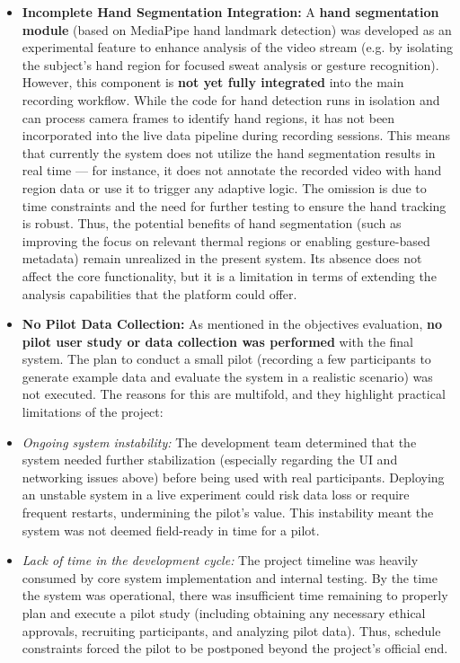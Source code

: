\documentclass[11pt,a4paper]{report}
\begin{document}
\begin{itemize}
\item \textbf{Incomplete Hand Segmentation Integration:} A \textbf{hand segmentation
  module} (based on MediaPipe hand landmark detection) was developed as
  an experimental feature to enhance analysis of the video stream (e.g.
  by isolating the subject's hand region for focused sweat analysis or
  gesture recognition). However, this component is \textbf{not yet fully
  integrated} into the main recording workflow. While the code for hand
  detection runs in isolation and can process camera frames to identify
  hand regions, it has not been incorporated into the live data pipeline
  during recording sessions. This means that currently the system does
  not utilize the hand segmentation results in real time --- for
  instance, it does not annotate the recorded video with hand region
  data or use it to trigger any adaptive logic. The omission is due to
  time constraints and the need for further testing to ensure the hand
  tracking is robust. Thus, the potential benefits of hand segmentation
  (such as improving the focus on relevant thermal regions or enabling
  gesture-based metadata) remain unrealized in the present system. Its
  absence does not affect the core functionality, but it is a limitation
  in terms of extending the analysis capabilities that the platform
  could offer.

\item \textbf{No Pilot Data Collection:} As mentioned in the objectives
  evaluation, \textbf{no pilot user study or data collection was performed}
  with the final system. The plan to conduct a small pilot (recording a
  few participants to generate example data and evaluate the system in a
  realistic scenario) was not executed. The reasons for this are
  multifold, and they highlight practical limitations of the project:

\item \textit{Ongoing system instability:} The development team determined that the
  system needed further stabilization (especially regarding the UI and
  networking issues above) before being used with real participants.
  Deploying an unstable system in a live experiment could risk data loss
  or require frequent restarts, undermining the pilot's value. This
  instability meant the system was not deemed field-ready in time for a
  pilot.

\item \textit{Lack of time in the development cycle:} The project timeline was
  heavily consumed by core system implementation and internal testing.
  By the time the system was operational, there was insufficient time
  remaining to properly plan and execute a pilot study (including
  obtaining any necessary ethical approvals, recruiting participants,
  and analyzing pilot data). Thus, schedule constraints forced the pilot
  to be postponed beyond the project's official end.


\end{itemize}
\end{document}
